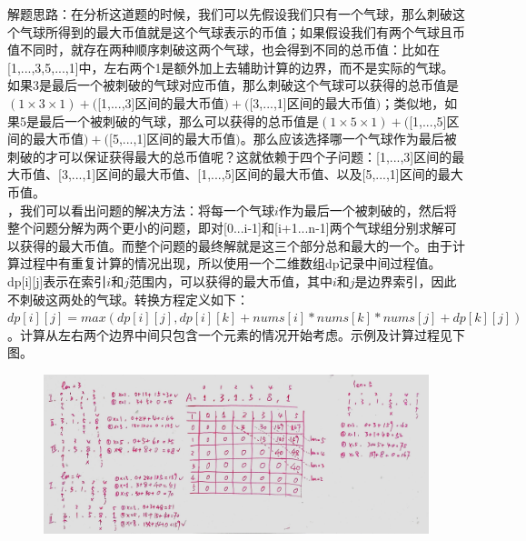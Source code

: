 \documentclass[a4paper,10pt]{article}
\begin{document}
\begin{CJK*}{UTF8}{gbsn}
\noindent 解题思路：在分析这道题的时候，我们可以先假设我们只有一个气球，那么刺破这个气球所得到的最大币值就是这个气球表示的币值；如果假设我们有两个气球且币值不同时，就存在两种顺序刺破这两个气球，也会得到不同的总币值：比如在[1,...,3,5,...,1]中，左右两个1是额外加上去辅助计算的边界，而不是实际的气球。如果3是最后一个被刺破的气球对应币值，那么刺破这个气球可以获得的总币值是$(1\times3\times1) + ($[1,...,3]区间的最大币值$) + ($[3,...,1]区间的最大币值$)$；类似地，如果5是最后一个被刺破的气球，那么可以获得的总币值是$(1\times5\times1) + ($[1,...,5]区间的最大币值$) + ($[5,...,1]区间的最大币值$)$。那么应该选择哪一个气球作为最后被刺破的才可以保证获得最大的总币值呢？这就依赖于四个子问题：[1,...,3]区间的最大币值、[3,...,1]区间的最大币值、[1,...,5]区间的最大币值、以及[5,...,1]区间的最大币值。\\

，我们可以看出问题的解决方法：将每一个气球$i$作为最后一个被刺破的，然后将整个问题分解为两个更小的问题，即对[0...i-1]和[i+1...n-1]两个气球组分别求解可以获得的最大币值。而整个问题的最终解就是这三个部分总和最大的一个。由于计算过程中有重复计算的情况出现，所以使用一个二维数组dp记录中间过程值。dp[i][j]表示在索引$i$和$j$范围内，可以获得的最大币值，其中$i$和$j$是边界索引，因此不刺破这两处的气球。转换方程定义如下：$dp[i][j] = max(dp[i][j], dp[i][k]+nums[i] * nums[k] * nums[j] + dp[k][j])$。计算从左右两个边界中间只包含一个元素的情况开始考虑。示例及计算过程见下图。
\end{CJK*}

\begin{figure}[h]
    \includegraphics[width=\textwidth]{leetcode312.jpg}
    \centering \\
\end{figure}
\end{document}

